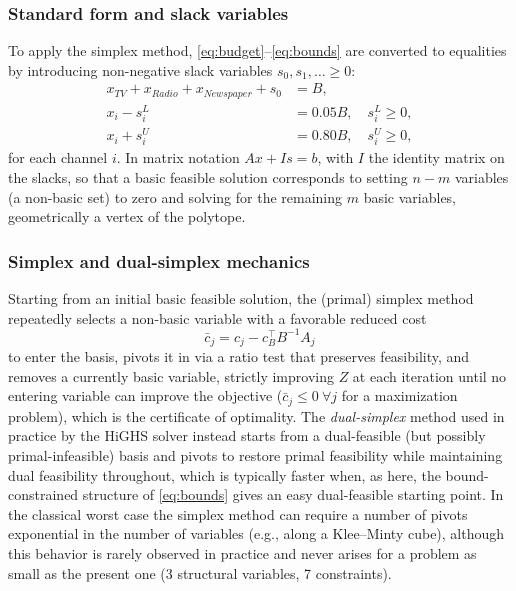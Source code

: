 \documentclass[conference]{IEEEtran}
\begin{document}
\subsubsection{Standard form and slack variables}
To apply the simplex method, \eqref{eq:budget}--\eqref{eq:bounds} are converted to equalities by introducing non-negative slack variables $s_0,s_1,\dots \ge 0$:
\begin{align}
x_{TV}+x_{Radio}+x_{Newspaper}+s_0 &= B,\\
x_i - s_i^{L} &= 0.05B, \quad s_i^L \ge 0, \\
x_i + s_i^{U} &= 0.80B, \quad s_i^{U} \ge 0,
\end{align}
for each channel $i$. In matrix notation $A x + Is = b$, with $I$ the identity matrix on the slacks, so that a basic feasible solution corresponds to setting $n-m$ variables (a non-basic set) to zero and solving for the remaining $m$ basic variables, geometrically a vertex of the polytope.

\subsubsection{Simplex and dual-simplex mechanics}
Starting from an initial basic feasible solution, the (primal) simplex method repeatedly selects a non-basic variable with a favorable reduced cost
\begin{equation}
\bar c_j = c_j - c_B^\top B^{-1}A_j
\end{equation}
to enter the basis, pivots it in via a ratio test that preserves feasibility, and removes a currently basic variable, strictly improving $Z$ at each iteration until no entering variable can improve the objective ($\bar c_j \le 0\ \forall j$ for a maximization problem), which is the certificate of optimality. The \emph{dual-simplex} method used in practice by the HiGHS solver \cite{huangfu_hall_2018} instead starts from a dual-feasible (but possibly primal-infeasible) basis and pivots to restore primal feasibility while maintaining dual feasibility throughout, which is typically faster when, as here, the bound-constrained structure of \eqref{eq:bounds} gives an easy dual-feasible starting point. In the classical worst case the simplex method can require a number of pivots exponential in the number of variables (e.g., along a Klee--Minty cube), although this behavior is rarely observed in practice and never arises for a problem as small as the present one (3 structural variables, 7 constraints).
\end{document}

